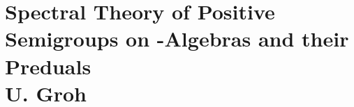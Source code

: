 
\chapter{Spectral Theory of Positive Semigroups on \WA-Algebras and their Preduals \\
\Large{U. Groh}}\label{chap:D-III}

%
%
%
%
%
%
